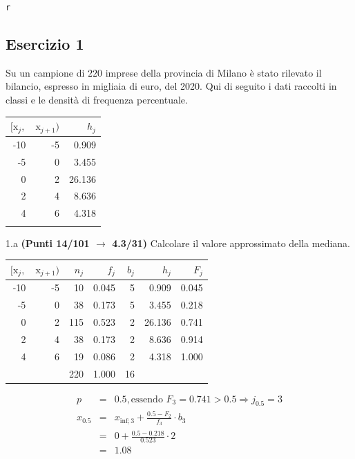 \documentclass[
  11pt,
]{book}
\theoremstyle{mytheoremstyle}
\theoremstyle{mydefstyle}
\newenvironment{sol}
  {
  \begin{tcolorbox}[enhanced,breakable,arc=0.1mm,boxrule=1pt,colback=white,colframe=iblue,
  title=\bf \fontfamily{lmss}\selectfont \hspace{.5 cm} Soluzione,drop fuzzy shadow]

}{
\end{tcolorbox}
  }
\begin{document}
\texttt{r}

\subsection{Esercizio 1}\label{esercizio-1-19}

Su un campione di \(220\) imprese della provincia di Milano è stato
rilevato il bilancio, espresso in migliaia di euro, del 2020. Qui di seguito i dati raccolti in classi
e le densità di frequenza percentuale.

\begin{table}[H]
\centering
\begin{tabular}{rrr}
\toprule
$[\text{x}_j,$ & $\text{x}_{j+1})$ & $h_j$\\
\midrule
-10 & -5 & 0.909\\
-5 & 0 & 3.455\\
0 & 2 & 26.136\\
2 & 4 & 8.636\\
4 & 6 & 4.318\\
 &  & \\
\bottomrule
\end{tabular}
\end{table}

1.a \textbf{(Punti 14/101 \(\rightarrow\) 4.3/31)} Calcolare il valore approssimato della mediana.

\begin{sol}

\begin{table}[H]
\centering
\begin{tabular}{rrrrrrr}
\toprule
$[\text{x}_j,$ & $\text{x}_{j+1})$ & $n_j$ & $f_j$ & $b_j$ & $h_j$ & $F_j$\\
\midrule
-10 & -5 & 10 & 0.045 & 5 & 0.909 & 0.045\\
-5 & 0 & 38 & 0.173 & 5 & 3.455 & 0.218\\
0 & 2 & 115 & 0.523 & 2 & 26.136 & 0.741\\
2 & 4 & 38 & 0.173 & 2 & 8.636 & 0.914\\
4 & 6 & 19 & 0.086 & 2 & 4.318 & 1.000\\
 &  & 220 & 1.000 & 16 &  & \\
\bottomrule
\end{tabular}
\end{table}

\begin{eqnarray*}
  p &=&  0.5 , \text{essendo }F_{ 3 }= 0.741  > 0.5  \Rightarrow j_{ 0.5 }= 3 \\
  x_{ 0.5 } &=& x_{\text{inf}; 3 } + \frac{ { 0.5 } - F_{ 2 }} {f_{ 3 }} \cdot b_{ 3 } \\
            &=&  0  + \frac {{ 0.5 } -  0.218 } { 0.523 } \cdot  2  \\
            &=&  1.08 
\end{eqnarray*}

\end{sol}
\end{document}

